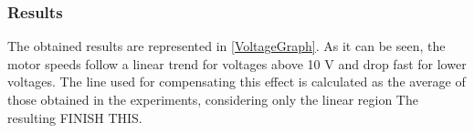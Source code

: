 \subsubsection{Results}
The obtained results are represented in \autoref{VoltageGraph}. As it can be seen, the motor speeds follow a linear trend for voltages above 10 V and drop fast for lower voltages. The line used for compensating this effect is calculated as the average of those obtained in the experiments, considering only the linear region
The resulting FINISH THIS.
